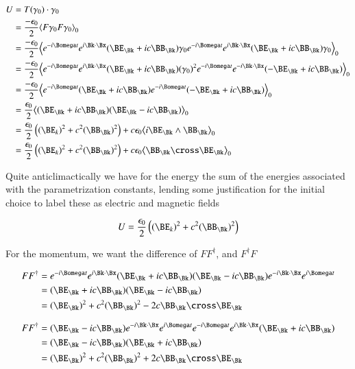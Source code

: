 \begin{align*}
U &= T(\gamma_0) \cdot \gamma_0 \\
&= \frac{-\epsilon_0}{2}\gpgradezero{ F \gamma_0 F \gamma_0 } \\
&= \frac{-\epsilon_0}{2}\gpgradezero{ 
e^{-i\Bomega t} e^{i \Bk \cdot \Bx} (\BE_\Bk + i c \BB_\Bk)
\gamma_0 
e^{-i\Bomega t} e^{i \Bk \cdot \Bx} (\BE_\Bk + i c \BB_\Bk)
\gamma_0 } \\
&= \frac{-\epsilon_0}{2}\gpgradezero{ 
e^{-i\Bomega t} e^{i \Bk \cdot \Bx} (\BE_\Bk + i c \BB_\Bk)
(\gamma_0)^2
e^{-i\Bomega t} e^{-i \Bk \cdot \Bx} (-\BE_\Bk + i c \BB_\Bk)
} \\
&= \frac{-\epsilon_0}{2}\gpgradezero{ 
e^{-i\Bomega t} (\BE_\Bk + i c \BB_\Bk) e^{-i\Bomega t} (-\BE_\Bk + i c \BB_\Bk)
} \\
&= \frac{\epsilon_0}{2}\gpgradezero{ (\BE_\Bk + i c \BB_\Bk) (\BE_\Bk - i c \BB_\Bk) } \\
&= 
\frac{\epsilon_0}{2} \left( (\BE_k)^2 + c^2 (\BB_\Bk)^2\right) + {c \epsilon_0} \gpgradezero{ i \BE_\Bk \wedge \BB_\Bk } \\
&= 
\frac{\epsilon_0}{2} \left( (\BE_k)^2 + c^2 (\BB_\Bk)^2\right) + {c \epsilon_0} \gpgradezero{ \BB_\Bk \cross \BE_\Bk } \\
\end{align*}

Quite anticlimactically we have for the energy the sum of the energies associated with the parametrization constants, lending some justification for the initial choice to label these as electric and magnetic fields

\begin{align}
U = \frac{\epsilon_0}{2} \left( (\BE_k)^2 + c^2 (\BB_\Bk)^2\right)
\end{align}

For the momentum, we want the difference of $F F^\dagger$, and $F^\dagger F$

\begin{align*}
F F^\dagger 
&= e^{-i\Bomega t} e^{i \Bk \cdot \Bx} (\BE_\Bk + i c \BB_\Bk) (\BE_\Bk - i c \BB_\Bk) e^{-i \Bk \cdot \Bx} e^{i\Bomega t}  \\
&= (\BE_\Bk + i c \BB_\Bk) (\BE_\Bk - i c \BB_\Bk) \\
&= (\BE_\Bk)^2 + c^2 (\BB_\Bk)^2 - 2 c \BB_\Bk \cross \BE_\Bk
\end{align*}

\begin{align*}
F F^\dagger 
&= (\BE_\Bk - i c \BB_\Bk) e^{-i \Bk \cdot \Bx} e^{i\Bomega t}  e^{-i\Bomega t} e^{i \Bk \cdot \Bx} (\BE_\Bk + i c \BB_\Bk)  \\
&= (\BE_\Bk - i c \BB_\Bk) (\BE_\Bk + i c \BB_\Bk) \\
&= (\BE_\Bk)^2 + c^2 (\BB_\Bk)^2 + 2 c \BB_\Bk \cross \BE_\Bk
\end{align*}

